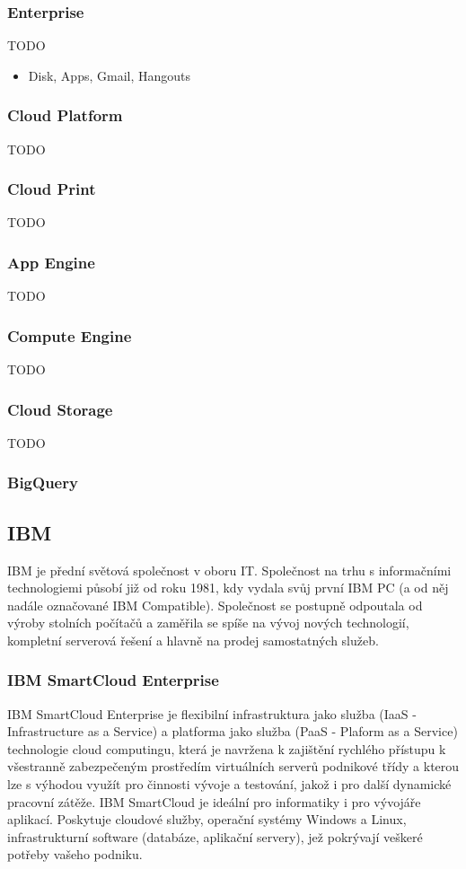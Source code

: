 \subsubsection{Enterprise}
TODO
\begin{itemize}
	\item Disk, Apps, Gmail, Hangouts
\end{itemize}

\subsubsection{Cloud Platform}
TODO

\subsubsection{Cloud Print}
TODO

\subsubsection{App Engine}
TODO

\subsubsection{Compute Engine}
TODO

\subsubsection{Cloud Storage}
TODO

\subsubsection{BigQuery}

\subsection{IBM}
IBM je přední světová společnost v oboru IT. Společnost na trhu s informačními technologiemi působí již od roku 1981, kdy vydala svůj první IBM PC (a od něj nadále označované IBM Compatible). Společnost se postupně odpoutala od výroby stolních počítačů a zaměřila se spíše na vývoj nových technologií, kompletní serverová řešení a hlavně na prodej samostatných služeb.

\subsubsection{IBM SmartCloud Enterprise}
IBM SmartCloud Enterprise je flexibilní infrastruktura jako služba (IaaS - Infrastructure as a Service) a platforma jako služba (PaaS - Plaform as a Service) technologie cloud computingu, která je navržena k zajištění rychlého přístupu k všestranně zabezpečeným prostředím virtuálních serverů podnikové třídy a kterou lze s výhodou využít pro činnosti vývoje a testování, jakož i pro další dynamické pracovní zátěže. IBM SmartCloud je ideální pro informatiky i pro vývojáře aplikací. Poskytuje cloudové služby, operační systémy Windows a Linux, infrastrukturní software (databáze, aplikační servery), jež pokrývají veškeré potřeby vašeho podniku.\cite{ibm:smartCloudEnt}

